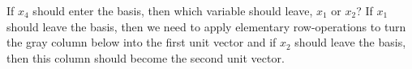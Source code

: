 If $x_4$ should enter the basis, then which variable should leave,
$x_1$ or $x_2$? If $x_1$ should leave the basis, then we need to apply
elementary row-operations to turn the gray column below into the first
unit vector and if $x_2$ should leave the basis, then this column should
become the second unit vector. 

